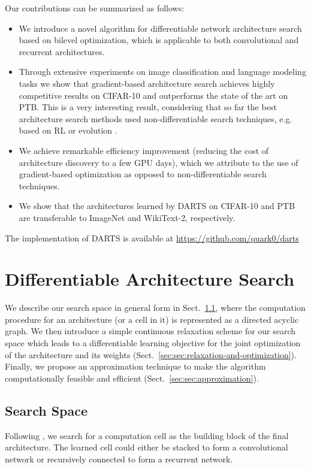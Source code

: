 \documentclass{article}
\begin{document}
Our contributions can be summarized as follows:
\begin{itemize}
\item We introduce a novel algorithm for differentiable network architecture search based on bilevel optimization, which is applicable to both convolutional and recurrent architectures.
\item Through extensive experiments on image classification and language modeling tasks we show that gradient-based architecture search achieves highly competitive results on \mbox{CIFAR-10} and outperforms the state of the art on PTB. This is a very interesting result, considering that so far the best architecture search methods used non-differentiable search techniques, e.g. based on RL \citep{zoph2017learning} or evolution \citep{real2018regularized, liu2017hierarchical}.
\item We achieve remarkable efficiency improvement (reducing the cost of architecture discovery to a few GPU days), which we attribute to the use of gradient-based optimization as opposed to non-differentiable search techniques.
\item We show that the architectures learned by DARTS on CIFAR-10 and PTB are transferable to ImageNet and WikiText-2, respectively.
\end{itemize}
The implementation of DARTS is available at \href{https://github.com/quark0/darts}{https://github.com/quark0/darts}

\section{Differentiable Architecture Search}
We describe our search space in general form in Sect.~\ref{sec:sec:search-space},
where the computation procedure for an architecture (or a cell in it) is represented as a directed acyclic graph.
We then introduce a simple continuous relaxation scheme for our search space
which leads to a differentiable learning objective for the joint optimization of the architecture and its weights (Sect.~\ref{sec:sec:relaxation-and-optimization}).
Finally, we propose an approximation technique to make the algorithm computationally feasible and efficient (Sect.~\ref{sec:sec:approximation}).

\subsection{Search Space}
\label{sec:sec:search-space}
Following \cite{zoph2017learning, real2018regularized, liu2017progressive, liu2017hierarchical},
we search for a computation cell as the building block of the final architecture.
The learned cell could either be stacked to form a convolutional network
or recursively connected to form a recurrent network.
\end{document}
